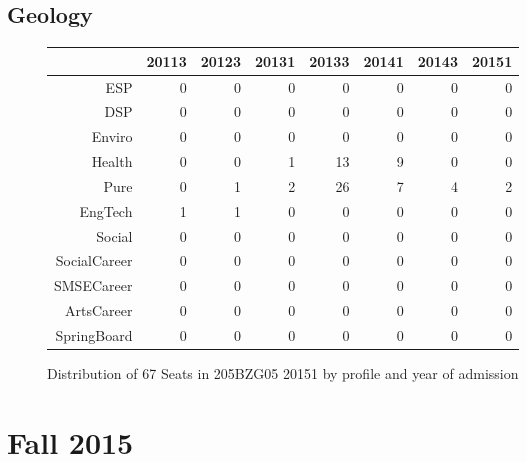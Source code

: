\documentclass{article}\usepackage[]{graphicx}\usepackage[]{color}
\begin{document}
\subsection{Geology}
\begin{figure}[H]
\centering
\begin{tabular}{rrrrrrrr}
  \hline
 & 20113 & 20123 & 20131 & 20133 & 20141 & 20143 & 20151 \\ 
  \hline
ESP &   0 &   0 &   0 &   0 &   0 &   0 &   0 \\ 
  DSP &   0 &   0 &   0 &   0 &   0 &   0 &   0 \\ 
  Enviro &   0 &   0 &   0 &   0 &   0 &   0 &   0 \\ 
  Health &   0 &   0 &   1 &  13 &   9 &   0 &   0 \\ 
  Pure &   0 &   1 &   2 &  26 &   7 &   4 &   2 \\ 
  EngTech &   1 &   1 &   0 &   0 &   0 &   0 &   0 \\ 
  Social &   0 &   0 &   0 &   0 &   0 &   0 &   0 \\ 
  SocialCareer &   0 &   0 &   0 &   0 &   0 &   0 &   0 \\ 
  SMSECareer &   0 &   0 &   0 &   0 &   0 &   0 &   0 \\ 
  ArtsCareer &   0 &   0 &   0 &   0 &   0 &   0 &   0 \\ 
  SpringBoard &   0 &   0 &   0 &   0 &   0 &   0 &   0 \\ 
   \hline
\end{tabular}
\caption{Distribution of 67 Seats in 205BZG05 20151 by profile and year of admission} 
\end{figure}


\section{Fall 2015}
\end{document}
